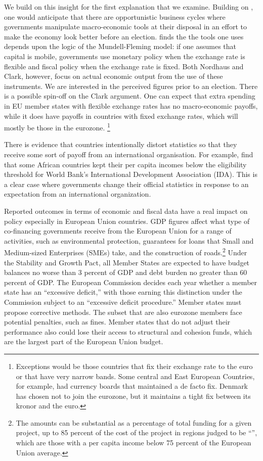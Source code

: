 \documentclass[]{article}
\begin{document}
We build on this insight for the first explanation that we examine. Building on \cite{nordhaus1975}, one would anticipate that there are opportunistic business cycles where governments manipulate macro-economic tools at their disposal in an effort to make the economy look better before an election. \cite{clark2003} finds the the tools one uses depends upon the logic of the Mundell-Fleming model: if one assumes that capital is mobile, governments use monetary policy when the exchange rate is flexible and fiscal policy when the exchange rate is fixed. Both Nordhaus and Clark, however, focus on actual economic output from the use of these instruments. We are interested in the perceived figures prior to an election. There is  a possible spin-off on the Clark argument. One can expect that extra spending in EU member states with flexible exchange rates has no macro-economic payoffs, while it does have payoffs in countries with fixed exchange rates, which will mostly be those in the eurozone. \footnote{Exceptions would be those countries that fix their exchange rate to the euro or that have very narrow bands. Some central and East European Countries, for example, had currency boards that maintained a de facto fix. Denmark has chosen not to join the eurozone, but it maintains a tight fix between its kronor and the euro.}

There is evidence that countries intentionally distort statistics so that they receive some sort of payoff from an international organisation. For example, \cite{kerner2016} find that some African countries kept their per capita incomes below the  eligibility threshold for World Bank’s International Development Association (IDA). This is a clear case where governments change their official statistics in response to an expectation from an international organization.

Reported outcomes in terms of economic and fiscal data have a real impact on policy especially in European Union countries. GDP figures affect what type of co-financing governments receive from the European Union for a range of activities, such as environmental protection, guarantees for loans that Small and Medium-sized Enterprises (SMEs) take, and the construction of roads.\footnote{The amounts can be substantial as a percentage of total funding for a given project, up to 85 percent of the cost of the project in regions judged to be “”, which are those with a per capita income below 75 percent of the European Union average.} Under the Stability and Growth Pact, all Member States are expected to have budget balances no worse than 3 percent of GDP and debt burden no greater than 60 percent of GDP. The European Commission decides each year whether a member state has an “excessive deficit,” with those earning this distinction under the Commission subject to an “excessive deficit procedure.” Member states must propose corrective methods. The subset that are also eurozone members face potential penalties, such as fines. Member states that do not adjust their performance also could lose their access to structural and cohesion funds, which are the largest part of the European Union budget.
\end{document}
